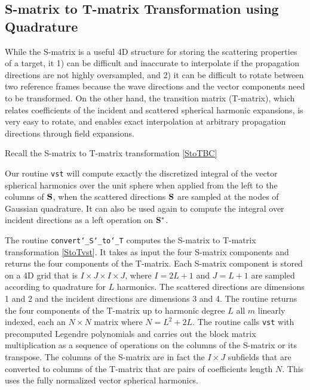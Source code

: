 \subsection{S-matrix to T-matrix Transformation using Quadrature}
\label{fastStoT}

While the S-matrix is a useful 4D structure for storing the scattering properties of a target, it 1) can be difficult and inaccurate to interpolate if the propagation directions are not highly oversampled, and 2) it can be difficult to rotate between two reference frames because the wave directions and the vector components need to be transformed. On the other hand, the transition matrix (T-matrix), which relates coefficients of the incident and scattered spherical harmonic expansions, is very easy to rotate, and enables exact interpolation at arbitrary propagation directions through field expansions.  

Recall the S-matrix to T-matrix transformation \eqref{StoTBC}

Our routine \texttt{vst} will compute exactly the discretized integral of the vector spherical harmonics over the unit sphere when applied from the left to the columns of $\mathbf{S}$, when the scattered directions $\mathbf{S}$ are sampled at the nodes of Gaussian quadrature. It can also be used again to compute the integral over incident directions as a left operation on $\mathbf{S}^*$.

The routine \texttt{convert\char`_S\char`_to\char`_T} computes the S-matrix to T-matrix transformation \eqref{StoTvst}. It takes as input the four S-matrix components and returns the four components of the T-matrix. Each S-matrix component is stored on a 4D grid that is $I \times J \times I \times J$, where $I = 2L+1$ and $J = L+1$ are sampled according to quadrature for $L$ harmonics. The scattered directions are dimensions 1 and 2 and the incident directions are dimensions 3 and 4. The routine returns the four components of the T-matrix up to harmonic degree $L$ all $m$ linearly indexed, each an $N \times N$ matrix where $N = L^2 + 2L$. The routine calls \texttt{vst} with precomputed Legendre polynomials and carries out the block matrix multiplication as a sequence of operations on the columns of the S-matrix or its transpose. The columns of the S-matrix are in fact the $I \times J$ subfields that are converted to columns of the T-matrix that are pairs of coefficients length $N$. This uses the fully normalized vector spherical harmonics.
\clearpage

